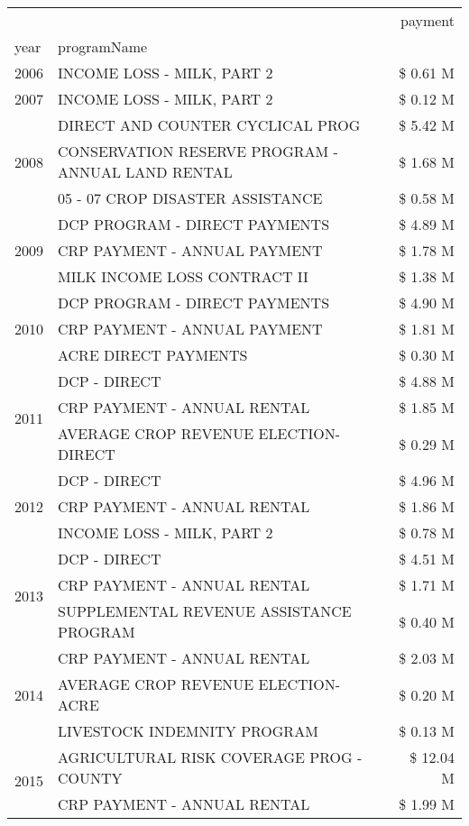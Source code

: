 \begin{tabular}{llr}
\toprule
 &  & payment \\
year & programName &  \\
\midrule
2006 & INCOME LOSS - MILK, PART 2 & \$ 0.61 M \\
\cline{1-3}
2007 & INCOME LOSS - MILK, PART 2 & \$ 0.12 M \\
\cline{1-3}
\multirow[t]{3}{*}{2008} & DIRECT AND COUNTER CYCLICAL PROG & \$ 5.42 M \\
 & CONSERVATION RESERVE PROGRAM - ANNUAL LAND RENTAL & \$ 1.68 M \\
 & 05 - 07 CROP DISASTER ASSISTANCE & \$ 0.58 M \\
\cline{1-3}
\multirow[t]{3}{*}{2009} & DCP PROGRAM - DIRECT PAYMENTS & \$ 4.89 M \\
 & CRP PAYMENT - ANNUAL PAYMENT & \$ 1.78 M \\
 & MILK INCOME LOSS CONTRACT II & \$ 1.38 M \\
\cline{1-3}
\multirow[t]{3}{*}{2010} & DCP PROGRAM - DIRECT PAYMENTS & \$ 4.90 M \\
 & CRP PAYMENT - ANNUAL PAYMENT & \$ 1.81 M \\
 & ACRE DIRECT PAYMENTS & \$ 0.30 M \\
\cline{1-3}
\multirow[t]{3}{*}{2011} & DCP - DIRECT & \$ 4.88 M \\
 & CRP PAYMENT - ANNUAL RENTAL & \$ 1.85 M \\
 & AVERAGE CROP REVENUE ELECTION-DIRECT & \$ 0.29 M \\
\cline{1-3}
\multirow[t]{3}{*}{2012} & DCP - DIRECT & \$ 4.96 M \\
 & CRP PAYMENT - ANNUAL RENTAL & \$ 1.86 M \\
 & INCOME LOSS - MILK, PART 2 & \$ 0.78 M \\
\cline{1-3}
\multirow[t]{3}{*}{2013} & DCP - DIRECT & \$ 4.51 M \\
 & CRP PAYMENT - ANNUAL RENTAL & \$ 1.71 M \\
 & SUPPLEMENTAL REVENUE ASSISTANCE PROGRAM & \$ 0.40 M \\
\cline{1-3}
\multirow[t]{3}{*}{2014} & CRP PAYMENT - ANNUAL RENTAL & \$ 2.03 M \\
 & AVERAGE CROP REVENUE ELECTION-ACRE & \$ 0.20 M \\
 & LIVESTOCK INDEMNITY PROGRAM & \$ 0.13 M \\
\cline{1-3}
\multirow[t]{3}{*}{2015} & AGRICULTURAL RISK COVERAGE PROG - COUNTY & \$ 12.04 M \\
 & CRP PAYMENT - ANNUAL RENTAL & \$ 1.99 M \\

\end{tabular}
